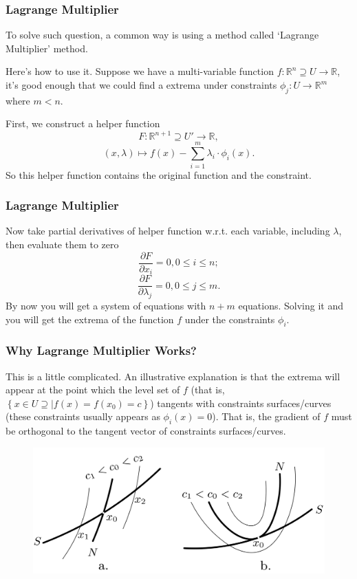 \documentclass[compress]{beamer}
\begin{document}
\begin{frame}
  \frametitle{Lagrange Multiplier}
  To solve such question, a common way is using a method called `Lagrange Multiplier' method.

  Here's how to use it. Suppose we have a multi-variable function \(f : \mathbb{R}^n \supseteq U \to \mathbb{R}\), it's good enough that we could find
  a extrema under constraints \(\phi_j : U \to \mathbb{R}^m\) where \(m<n\).

  First, we construct a helper function
  \[F : \mathbb{R}^{n+1}\supseteq U' \to \mathbb{R},\]
  \[(x,\lambda) \mapsto f(x) - \sum_{i=1}^m \lambda_i \cdot \phi_i(x). \]
  So this helper function contains the original function and the constraint.
\end{frame}

\begin{frame}
  \frametitle{Lagrange Multiplier}
  Now take partial derivatives of helper function w.r.t. each variable, including \(\lambda\), then evaluate them to zero
  \[\frac{\partial F}{\partial x_i} = 0, 0\leq i \leq n;\]
  \[\frac{\partial F}{\partial\lambda_j} = 0, 0 \leq j \leq m.\]
  By now you will get a system of equations with \(n+m\) equations. Solving it and you will get the extrema of the function \(f\)
  under the constraints \(\phi_i\).
\end{frame}

\begin{frame}
  \frametitle{Why Lagrange Multiplier Works?}
  This is a little complicated. An illustrative explanation is that the extrema will appear
  at the point which the level set of \(f\) (that is, \(\left\{ x \in U \supseteq \Big| f(x) = f(x_0) = c \right\}\))
  tangents with constraints surfaces/curves (these constraints usually appears as \(\phi_i(x) = 0\)). That is, the gradient
  of \(f\) must be orthogonal to the tangent vector of constraints surfaces/curves.

  \begin{figure}[!h]
    \centering
    \includegraphics[width=0.7\linewidth]{pic/Lagrange.png}
  \end{figure}

\end{frame}
\end{document}
